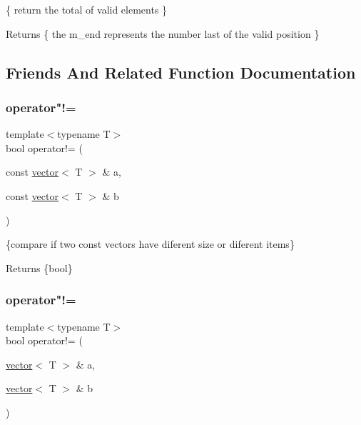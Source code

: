 \{ return the total of valid elements \} 

\begin{DoxyReturn}{Returns}
\{ the m\+\_\+end represents the number last of the valid position \} 
\end{DoxyReturn}


\subsection{Friends And Related Function Documentation}
\mbox{\label{classvector_a12f2274ae20637a056b99459320942f7}} 
\subsubsection{\texorpdfstring{operator"!=}{operator!=}\hspace{0.1cm}{\footnotesize\ttfamily [1/2]}}
{\footnotesize\ttfamily template$<$typename T$>$ \\
bool operator!= (\begin{DoxyParamCaption}\item[{const \hyperlink{classvector}{vector}$<$ T $>$ \&}]{a,  }\item[{const \hyperlink{classvector}{vector}$<$ T $>$ \&}]{b }\end{DoxyParamCaption})\hspace{0.3cm}{\ttfamily [friend]}}



\{compare if two const vectors have diferent size or diferent items\} 

\begin{DoxyReturn}{Returns}
\{bool\} 
\end{DoxyReturn}
\mbox{\label{classvector_a6e1890e0a27d2c159aa4a53bda3d8b5b}} 
\subsubsection{\texorpdfstring{operator"!=}{operator!=}\hspace{0.1cm}{\footnotesize\ttfamily [2/2]}}
{\footnotesize\ttfamily template$<$typename T$>$ \\
bool operator!= (\begin{DoxyParamCaption}\item[{\hyperlink{classvector}{vector}$<$ T $>$ \&}]{a,  }\item[{\hyperlink{classvector}{vector}$<$ T $>$ \&}]{b }\end{DoxyParamCaption})\hspace{0.3cm}{\ttfamily [friend]}}



